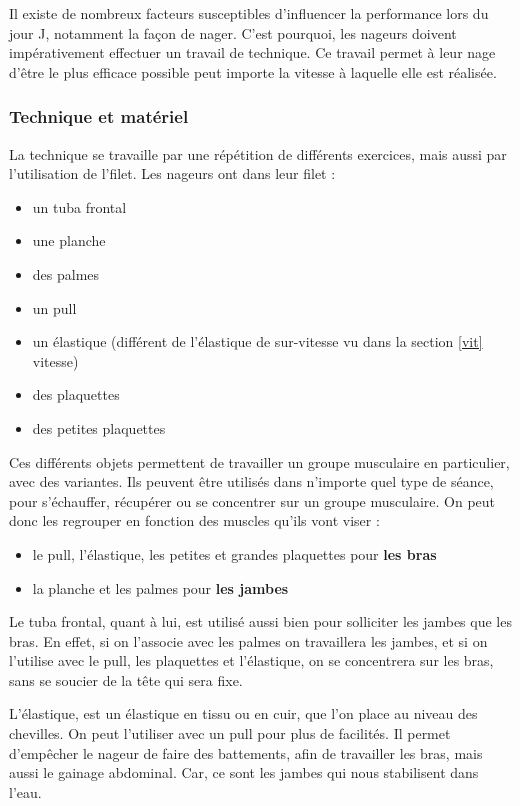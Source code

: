 Il existe de nombreux facteurs susceptibles d'influencer la performance lors du jour J, notamment la façon de nager. C'est pourquoi, les nageurs doivent impérativement effectuer un travail de technique. Ce travail permet à leur nage d'être le plus efficace possible peut importe la vitesse à laquelle elle est réalisée.


\subsubsection{Technique et matériel}

La technique se travaille par une répétition de différents exercices, mais aussi par l'utilisation de l'\gls{filet}. Les nageurs ont dans leur \gls{filet} :

\begin{itemize}
\item un tuba frontal
\item une planche
\item des palmes
\item un pull
\item un élastique (différent de l'élastique de sur-vitesse vu dans la section \ref{vit} vitesse)
\item des plaquettes
\item des petites plaquettes
\end{itemize}

Ces différents objets permettent de travailler un groupe musculaire en particulier, avec des variantes. Ils peuvent être utilisés dans n'importe quel type de séance, pour s'échauffer, récupérer ou se concentrer sur un groupe musculaire. On peut donc les regrouper en fonction des muscles qu'ils vont viser :
\begin{itemize}
\item le pull, l'élastique, les petites et grandes plaquettes pour \textbf{les bras}
\item la planche et les palmes pour \textbf{les jambes}
\end{itemize}
Le tuba frontal, quant à lui, est utilisé aussi bien pour solliciter les jambes que les bras. En effet, si on l'associe avec les palmes on travaillera les jambes, et si on l'utilise avec le pull, les plaquettes et l'élastique, on se concentrera sur les bras, sans se soucier de la tête qui sera fixe.

\vspace{12pt}

L'élastique, est un élastique en tissu ou en cuir, que l'on place au niveau des chevilles. On peut l'utiliser avec un pull pour plus de facilités. Il permet d'empêcher le nageur de faire des battements, afin de travailler les bras, mais aussi le gainage abdominal. Car, ce sont les jambes qui nous stabilisent dans l'eau.

